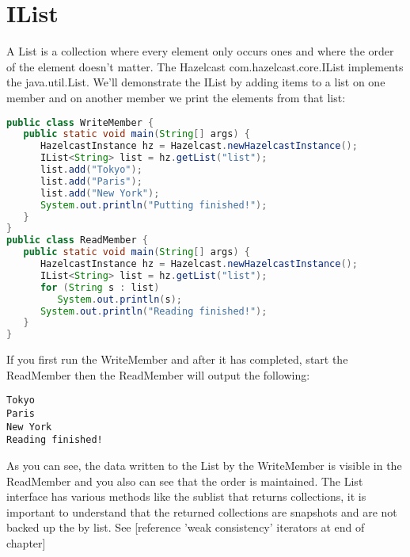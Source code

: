 \section{IList}
A List is a collection where every element only occurs ones and where the order of the element doesn't matter. The Hazelcast com.hazelcast.core.IList implements the java.util.List. We'll demonstrate the IList by adding items to a list on one member and on another member we print the elements from that list:
\begin{lstlisting}[language=java]
public class WriteMember {
   public static void main(String[] args) {
      HazelcastInstance hz = Hazelcast.newHazelcastInstance();
      IList<String> list = hz.getList("list");
      list.add("Tokyo");
      list.add("Paris");
      list.add("New York");
      System.out.println("Putting finished!");
   }
}
public class ReadMember {
   public static void main(String[] args) {
      HazelcastInstance hz = Hazelcast.newHazelcastInstance();
      IList<String> list = hz.getList("list");
      for (String s : list) 
         System.out.println(s);
      System.out.println("Reading finished!");
   }
}
\end{lstlisting}
If you first run the WriteMember and after it has completed, start the ReadMember then the ReadMember will output the following:
\begin{lstlisting}
Tokyo
Paris
New York
Reading finished!
\end{lstlisting}
As you can see, the data written to the List by the WriteMember is visible in the ReadMember and you also can see that the order is maintained. The List interface has various methods like the sublist that returns collections, it is important to understand that the returned collections are snapshots and are not backed up the by list. See [reference 'weak consistency' iterators at end of chapter]

